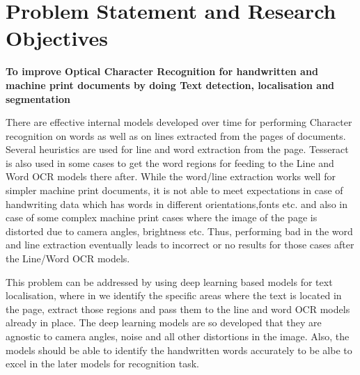 
%

{\let\clearpage\relax \chapter{Problem Statement and Research Objectives}}

\textbf{To improve Optical Character Recognition for handwritten and machine print documents by doing Text detection, localisation and segmentation}
\newline

There are effective internal models developed over time for performing Character recognition on words as well as on lines extracted from the pages of documents. Several heuristics are used for line and word extraction from the page. Tesseract is also used in some cases to get the word regions for feeding to the Line and Word OCR models there after. While the word/line extraction works well for simpler machine print documents, it is not able to meet expectations in case of handwriting data which has words in different orientations,fonts etc. and also in case of some complex machine print cases where the image of the page is distorted due to camera angles, brightness etc. Thus, performing bad in the word and line extraction eventually leads to incorrect or no results for those cases after the Line/Word OCR models.

This problem can be addressed by using deep learning based models for text localisation, where in we identify the specific areas where the text is located in the page, extract those regions and pass them to the line and word OCR models already in place. The deep learning models are so developed that they are agnostic to camera angles, noise and all other distortions in the image. Also, the models should be able to identify the handwritten words accurately to be albe to excel in the later models for recognition task.

